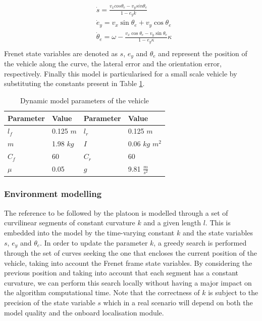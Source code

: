 \documentclass[letterpaper, 10 pt, conference]{ieeeconf}  %
\begin{document}
\begin{equation}
    \label{eq:frenet_model}
    \begin{aligned}
        & \dot s = \frac{v_x cos\theta_{e} - v_y sin\theta_{e}}{1 - e_{y} k } \\
		& \dot e_{y} = v_x \sin{\theta_{e}} + v_y \cos{\theta_{e}} \\
        & \dot \theta_{e} = \omega - \frac{v_x \cos{\theta_{e}} - v_y \sin{\theta_{e}} }{1 - e_{y} \kappa} \kappa \\
    \end{aligned}
\end{equation}
\noindent Frenet state variables are denoted as $s$, $e_{y}$ and $\theta_{e}$ and represent the position of the vehicle along the curve, the lateral error and the orientation error, respectively. Finally this model is particularised for a small scale vehicle by substituting the constants present in Table \ref{table:vehicle_parameters}.\\

\begin{table}
    \caption{Dynamic model parameters of the vehicle}
    \label{table:vehicle_parameters}
    \centering
    \begin{tabular}{ l|l||l|l }
    \hline
    Parameter & Value & Parameter & Value \\
    \hline
    \hline
    $l_f$       & 0.125  $m$    & $l_r$    & 0.125  $m$  \\
    $m$         & 1.98  $kg$   & $I$      & 0.06 $kg$ $m^2$  \\
    $C_f$       & 60            & $C_r$    & 60 \\
    $\mu$ 	    & 0.05          & $g$      & 9.81 $\frac{m}{s^2}$ \\      
    \hline
    \end{tabular}
\end{table}    

\subsubsection{Environment modelling}    

The reference to be followed by the platoon is modelled through a set of curvilinear segments of constant curvature $k$ and a given length $l$. This is embedded into the model by the time-varying constant $k$ and the state variables $s$, $e_{y}$ and $\theta_{e}$. In order to update the parameter $k$, a greedy search is performed through the set of curves seeking the one that encloses the current position of the vehicle, taking into account the Frenet frame state variables. By considering the previous position and taking into account that each segment has a constant curvature, we can perform this search locally without having a major impact on the algorithm computational time. Note that the correctness of $k$ is subject to the precision of the state variable $s$ which in a real scenario will depend on both the model quality and the onboard localisation module.\\
\end{document}
